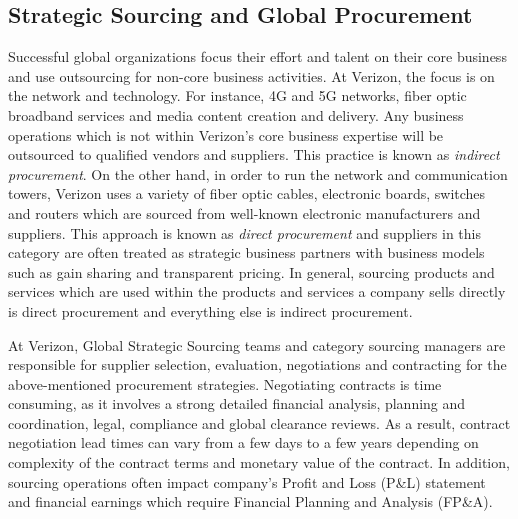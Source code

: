 \documentclass[inte,nonblindrev]{informs3} %
\begin{document}
\subsection{Strategic Sourcing and Global Procurement}
Successful global organizations focus their effort and talent on their core business and use outsourcing for non-core business activities. At Verizon, the focus is on the network and technology. For instance, 4G and 5G networks, fiber optic broadband services and media content creation and delivery. Any business operations which is not within Verizon's core business expertise will be outsourced to qualified vendors and suppliers. This practice is known as \textit{indirect procurement}. On the other hand, in order to run the network and communication towers, Verizon uses a variety of fiber optic cables, electronic boards, switches and routers which are sourced from well-known electronic manufacturers and suppliers. This approach is known as \textit{direct procurement} and suppliers in this category are often treated as strategic business partners with business models such as gain sharing and transparent pricing. In general, sourcing products and services which are used within the products and services a company sells directly is direct procurement and everything else is indirect procurement. 

At Verizon, Global Strategic Sourcing teams and category sourcing managers are responsible for supplier selection, evaluation, negotiations and contracting for the above-mentioned procurement strategies. Negotiating contracts is time consuming, as it involves a strong detailed financial analysis, planning and coordination, legal, compliance and global clearance reviews. As a result, contract negotiation lead times can vary from a few days to a few years depending on complexity of the contract terms and monetary value of the contract. In addition, sourcing operations often impact company's Profit and Loss (P\&L) statement and financial earnings which require Financial Planning and Analysis (FP\&A). 
\end{document}
